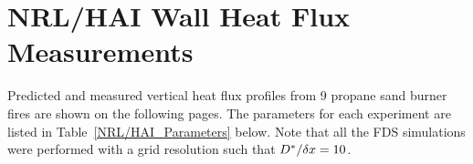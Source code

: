 %

\clearpage


\section{NRL/HAI Wall Heat Flux Measurements}

Predicted and measured vertical heat flux profiles from 9 propane sand burner fires are shown on the following pages.
The parameters for each
experiment are listed in Table~\ref{NRL/HAI_Parameters} below. Note that all the FDS simulations were performed with
a grid resolution such that
$D^*/\delta x=10$.

